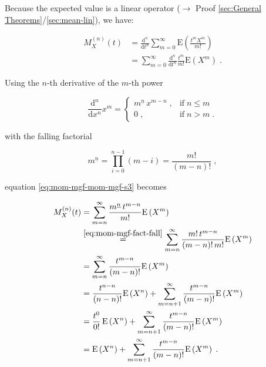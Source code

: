 \documentclass[a4paper,12pt,twoside]{book}
\begin{document}
Because the expected value is a linear operator ($\rightarrow$ Proof \ref{sec:General Theorems}/\ref{sec:mean-lin}), we have:

\begin{equation} \label{eq:mom-mgf-mom-mgf-s3}
\begin{split}
M_X^{(n)}(t) &= \frac{\mathrm{d}^n}{\mathrm{d}t^n} \sum_{m=0}^\infty \mathrm{E}\left( \frac{t^m X^m}{m!} \right) \\
&= \sum_{m=0}^\infty \frac{\mathrm{d}^n}{\mathrm{d}t^n} \frac{t^m}{m!} \mathrm{E}\left( X^m \right) \; .
\end{split}
\end{equation}

Using the $n$-th derivative of the $m$-th power

\begin{equation} \label{eq:mom-mgf-dndx-xm}
\frac{\mathrm{d}^n}{\mathrm{d}x^n} x^m = \left\{
\begin{array}{rl}
m^{\underline{n}} \, x^{m-n} \; , & \text{if} \; n \leq m \\
0 \; , & \text{if} \; n > m \; .
\end{array}
\right.
\end{equation}

with the falling factorial

\begin{equation} \label{eq:mom-mgf-fact-fall}
m^{\underline{n}} = \prod_{i=0}^{n-1} (m-i) = \frac{m!}{(m-n)!} \; ,
\end{equation}

equation \eqref{eq:mom-mgf-mom-mgf-s3} becomes

\begin{equation} \label{eq:mom-mgf-mom-mgf-s4}
\begin{split}
M_X^{(n)}(t) &= \sum_{m=n}^\infty \frac{m^{\underline{n}} \, t^{m-n}}{m!} \mathrm{E}\left( X^m \right) \\
&\overset{\eqref{eq:mom-mgf-fact-fall}}{=} \sum_{m=n}^\infty \frac{m! \, t^{m-n}}{(m-n)! \, m!} \mathrm{E}\left( X^m \right) \\
&= \sum_{m=n}^\infty \frac{t^{m-n}}{(m-n)!} \mathrm{E}\left( X^m \right) \\
&= \frac{t^{n-n}}{(n-n)!} \mathrm{E}\left( X^n \right) + \sum_{m=n+1}^\infty \frac{t^{m-n}}{(m-n)!} \mathrm{E}\left( X^m \right) \\
&= \frac{t^0}{0!} \, \mathrm{E}\left( X^n \right) + \sum_{m=n+1}^\infty \frac{t^{m-n}}{(m-n)!} \mathrm{E}\left( X^m \right) \\
&= \mathrm{E}\left( X^n \right) + \sum_{m=n+1}^\infty \frac{t^{m-n}}{(m-n)!} \mathrm{E}\left( X^m \right) \; .
\end{split}
\end{equation}
\end{document}

